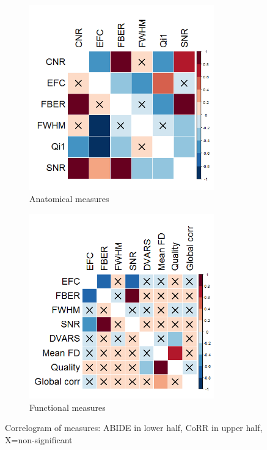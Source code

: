\documentclass{frontiersSCNS} %
\begin{document}
\begin{figure}[h]
  \centering
     \begin{subfigure}[b]{0.4\textwidth}
       \includegraphics[width=8cm]{fig2_bysite_sig_anat_corrplot}
       \caption{Anatomical measures}
     \end{subfigure}
     \begin{subfigure}[b]{0.4\textwidth}
       \includegraphics[width=8cm]{fig2_bysite_sig_func_corrplot}
       \caption{Functional measures}
     \end{subfigure} 
     \caption{Correlogram of measures: ABIDE in lower half, CoRR in upper half, X=non-significant}
\end{figure}
\end{document}
